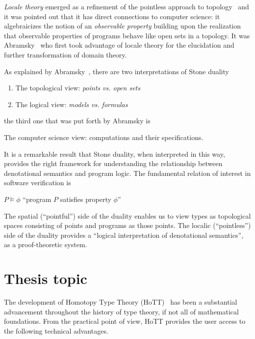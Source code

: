 \documentclass[11pt]{article}
\begin{document}
\emph{Locale theory} emerged as a refinement of the pointless approach to topology~\cite{%
johnstone:1982} and it was pointed out that it has direct connections to computer
science: it algebraicizes the notion of an \emph{observable property} building upon the
realization that observable properties of programs behave like open sets in a topology. It
was Abramsky~\cite{abramsky:1991} who first took advantage of locale theory for the
elucidation and further transformation of domain theory.

As explained by Abramsky~\cite{abramsky:1991}, there are two interpretations of Stone
duality

\begin{enumerate}
  \item The topological view: \emph{points vs. open sets}
  \item The logical view: \emph{models vs. formulas}
\end{enumerate}

the third one that was put forth by Abramsky is

\begin{center}
  The computer science view: computations and their specifications.
\end{center}

It is a remarkable result that Stone duality, when interpreted in this way, provides the
right framework for understanding the relationship between denotational semantics and
program logic. The fundamental relation of interest in software verification is

\begin{center}
  $P \vDash \phi$ \qquad ``program $P$ satisfies property $\phi$''
\end{center}

The spatial (``pointful'') side of the duality enables us to view types as topological
spaces consisting of points and programs as those points. The localic (``pointless'') side
of the duality provides a ``logical interpretation of denotational semantics'', as a
proof-theoretic system.

\section{Thesis topic}

The development of Homotopy Type Theory (HoTT)~\cite{hottbook} has been a substantial
advancement throughout the history of type theory, if not all of mathematical foundations.
From the practical point of view, HoTT provides the user access to the following technical
advantages.
\end{document}
